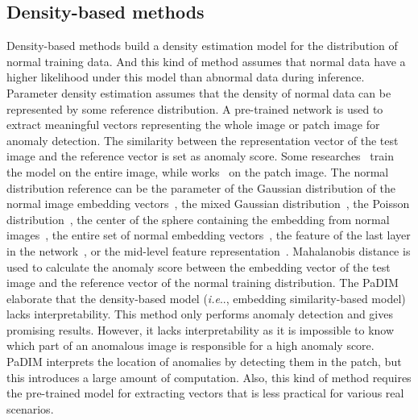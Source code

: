 \documentclass[lettersize,journal]{IEEEtran}
\makeatletter
\DeclareRobustCommand\onedot{\futurelet\@let@token\@onedot}
\def\@onedot{\ifx\@let@token.\else.\null\fi\xspace}
\def\ie{\emph{i.e}\onedot} \def\Ie{\emph{I.e}\onedot}
\makeatother
\begin{document}
\subsection{Density-based methods}
Density-based methods build a density estimation model for the distribution of normal training data. And this kind of method assumes that normal data have a higher likelihood under this model than abnormal data during inference. Parameter density estimation assumes that the density of normal data can be represented by some reference distribution.
A pre-trained network is used to extract meaningful vectors representing the whole image or patch image for anomaly detection. The similarity between the representation vector of the test image and the reference vector is set as anomaly score. Some researches~\cite{andrews2016transfer, nazare2018pre, bergman2019classification, rippel2021modeling, yang2020dfr, zeng2021reference} train the model on the entire image, while works~\cite{zhang2013region, yi2020patch, defard2021padim, bergmann2020uninformed} on the patch image.
The normal distribution reference can be the parameter of the Gaussian distribution of the normal image embedding vectors~\cite{chen2021unsupervised, defard2021padim}, the mixed Gaussian distribution~\cite{eskin2000anomaly,redner1984mixture}, the Poisson distribution~\cite{turcotte2016poisson}, the center of the sphere containing the embedding from normal images~\cite{ruff2018deep, yi2020patch}, the entire set of normal embedding vectors~\cite{cohen2020sub, bergman2020deep}, the feature of the last layer in the network~\cite{chen2001one, sabokrou2018deep}, or the mid-level feature representation~\cite{roth2022towards}. Mahalanobis distance is used to calculate the anomaly score between the embedding vector of the test image and the reference vector of the normal training distribution. 
The PaDIM\cite{defard2021padim} elaborate that the density-based model (\ie, embedding similarity-based model) lacks interpretability. This method only performs anomaly detection and gives promising results. However, it lacks interpretability as it is impossible to know which part of an anomalous image is responsible for a high anomaly score. PaDIM interprets the location of anomalies by detecting them in the patch, but this introduces a large amount of computation.
Also, this kind of method requires the pre-trained model for extracting vectors that is less practical for various real scenarios.
\end{document}
